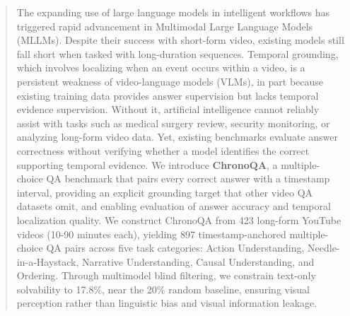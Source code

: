 \documentclass[sigconf,natbib=false,nonacm]{acmart}
\begin{document}
\begin{abstract}
The expanding use of large language models in intelligent workflows has triggered rapid advancement in Multimodal Large Language Models (MLLMs). Despite their success with short-form video, existing models still fall short when tasked with long-duration sequences.
Temporal grounding, which involves localizing when an event occurs within a video, is a persistent weakness of video-language models (VLMs), in part because existing training data provides answer supervision but lacks temporal evidence supervision.  
Without it, artificial intelligence cannot reliably assist with tasks such as medical surgery review, security monitoring, or analyzing long-form video data. Yet, existing benchmarks evaluate answer correctness without verifying whether a model identifies the correct supporting temporal evidence.
We introduce \textbf{ChronoQA}, a multiple-choice QA benchmark that pairs every correct answer with a timestamp interval, providing an explicit grounding target that other video QA datasets omit, and enabling evaluation of answer accuracy and temporal localization quality.
We construct ChronoQA from 423 long-form YouTube videos (10-90 minutes each), yielding 897 timestamp-anchored multiple-choice QA pairs across five task categories: Action Understanding, Needle-in-a-Haystack, Narrative Understanding, Causal Understanding, and Ordering. Through multimodel blind filtering, we constrain text-only solvability to 17.8\%, near the 20\% random baseline, ensuring visual perception rather than linguistic bias and visual information leakage. 
\end{abstract}


\end{document}
